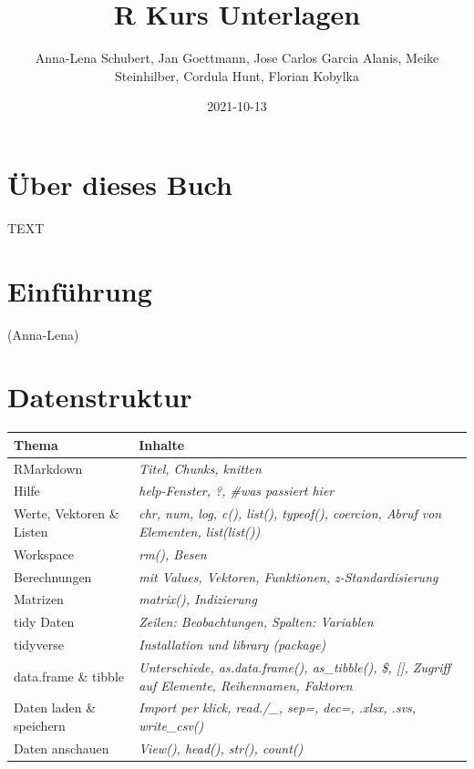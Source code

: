 \documentclass[
]{book}
\title{R Kurs Unterlagen}
\author{Anna-Lena Schubert,
Jan Goettmann,
Jose Carlos Garcia Alanis,
Meike Steinhilber,
Cordula Hunt,
Florian Kobylka}
\date{2021-10-13}
\theoremstyle{definition}
\theoremstyle{definition}
\theoremstyle{definition}
\theoremstyle{definition}
\theoremstyle{remark}
\begin{document}
\maketitle

{
\setcounter{tocdepth}{1}
\tableofcontents
}
\hypertarget{uxfcber-dieses-buch}{%
\chapter{Über dieses Buch}\label{uxfcber-dieses-buch}}

TEXT

\hypertarget{einfuxfchrung}{%
\chapter{Einführung}\label{einfuxfchrung}}

(Anna-Lena)

\hypertarget{datenstruktur}{%
\chapter{Datenstruktur}\label{datenstruktur}}

\begin{longtable}[]{@{}
  >{\centering\arraybackslash}p{}
  >{\centering\arraybackslash}p{}@{}}
\toprule
Thema & Inhalte \\
\midrule
\endhead
RMarkdown & \emph{Titel, Chunks, knitten} \\
Hilfe & \emph{help-Fenster, ?, \#was passiert hier} \\
Werte, Vektoren
\& Listen & \emph{chr, num, log, c(), list(), typeof(), coercion,
Abruf von Elementen, list(list())} \\
Workspace & \emph{rm(), Besen} \\
Berechnungen & \emph{mit Values, Vektoren, Funktionen, z-Standardisierung} \\
Matrizen & \emph{matrix(), Indizierung} \\
tidy Daten & \emph{Zeilen: Beobachtungen, Spalten: Variablen} \\
tidyverse & \emph{Installation und library (package)} \\
data.frame \&
tibble & \emph{Unterschiede, as.data.frame(), as\_tibble(), \$, {[}{]},
Zugriff auf Elemente, Reihennamen, Faktoren} \\
Daten laden
\& speichern & \emph{Import per klick, read./\_, sep=,
dec=, .xlsx, .svs, write\_csv()} \\
Daten anschauen & \emph{View(), head(), str(), count()} \\
\bottomrule
\end{longtable}
\end{document}
